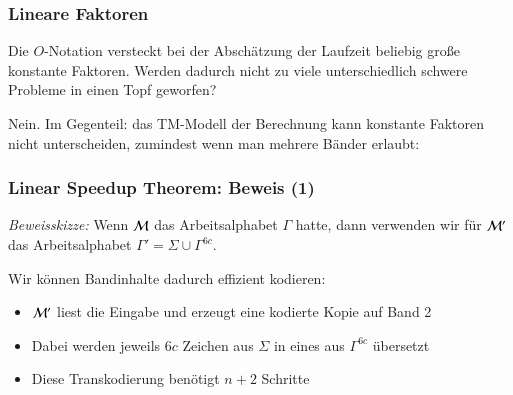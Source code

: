 \documentclass[aspectratio=1610,onlymath]{beamer}
\begin{document}
\begin{frame}\frametitle{Lineare Faktoren}

Die $O$-Notation versteckt bei der Abschätzung der Laufzeit beliebig große konstante
Faktoren. Werden dadurch nicht zu viele unterschiedlich schwere Probleme in einen Topf
geworfen?\bigskip\pause

\alert{Nein.} Im Gegenteil: das TM-Modell der Berechnung kann konstante Faktoren
nicht unterscheiden, zumindest wenn man mehrere Bänder erlaubt:\medskip

\medskip\pause


\end{frame}

\begin{frame}\frametitle{Linear Speedup Theorem: Beweis (1)}


\pause\emph{Beweisskizze:} Wenn $\mathcal{M}$ das Arbeitsalphabet $\Gamma$ hatte, dann verwenden wir für $\mathcal{M}'$ das Arbeitsalphabet $\Gamma'=\Sigma\cup\Gamma^{6c}$.
\bigskip

Wir können Bandinhalte dadurch effizient kodieren:
\begin{itemize}
\item $\mathcal{M}'$ liest die Eingabe und erzeugt eine kodierte Kopie auf Band 2
\item Dabei werden jeweils $6c$ Zeichen aus $\Sigma$ in eines aus $\Gamma^{6c}$ übersetzt
\item Diese Transkodierung benötigt $n+2$ Schritte
\end{itemize}


\end{frame}
\end{document}
